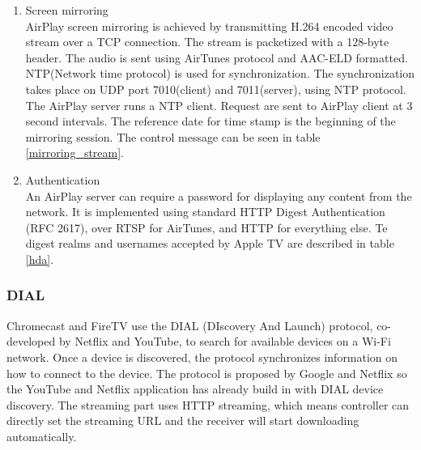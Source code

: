 \begin{enumerate}
\item Screen mirroring \\
AirPlay screen mirroring is achieved by transmitting H.264 encoded video stream
over a TCP connection. The stream is packetized with a 128-byte header. The
audio is sent using AirTunes protocol and AAC-ELD formatted. 
NTP(Network time protocol) is used for synchronization. The synchronization
takes place on UDP port 7010(client) and 7011(server), using NTP protocol. The
AirPlay server runs a NTP client. Request are sent to AirPlay client at 3
second intervals. The reference date for time stamp is the beginning of the
mirroring session.  The control message can be seen in table
\ref{mirroring_stream}.
\begin{table}[htb]
\caption{AirPlay Mirroring Control HTTP requests \label{mirroring_stream}}
\begin{center}
\end{center}
\end{table}
\item Authentication \\
An AirPlay server can require a password for displaying any content from the
network. It is implemented using standard HTTP Digest Authentication (RFC 2617),
over RTSP for AirTunes, and HTTP for everything else. Te digest realms and
usernames accepted by Apple TV are described in table \ref{hda}.
\begin{table}[htb]
\caption{AirPlay HTTP Digest Authentication \label{hda}}
\begin{center}
\end{center}
\end{table}
\end{enumerate}

\subsubsection{DIAL}
Chromecast and FireTV use the DIAL \cite{dial} (DIscovery And Launch) protocol,
co-developed by Netflix and YouTube, to search for available devices on a Wi-Fi network.
Once a device is discovered, the protocol synchronizes information on how to
connect to the device. The protocol is proposed by Google and Netflix so the
YouTube and Netflix application has already build in with DIAL device discovery. The
streaming part uses HTTP streaming, which means controller can directly set the
streaming URL and the receiver will start downloading automatically.

